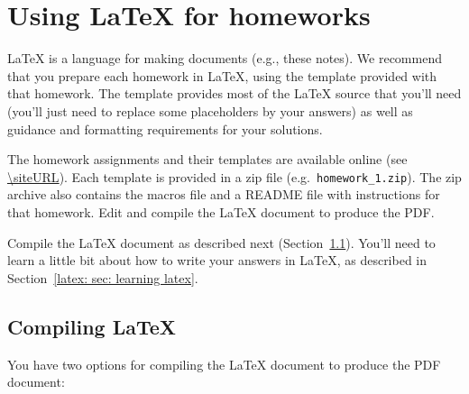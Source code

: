 
\section{Using LaTeX for homeworks}\label{latex: sec: latex}\hypertarget{latex.homeworks}{}

LaTeX is a language for making documents (e.g., these notes).
We recommend that you prepare each homework in LaTeX, using the template provided with that homework.
The template provides most of the LaTeX source that you'll need
(you'll just need to replace some placeholders by your answers)
as well as guidance and formatting requirements for your solutions.

The homework assignments and their templates are available online
(see \url{\siteURL}).
Each template is provided in a zip file (e.g.~\texttt{homework\_1.zip}).
The zip archive also contains the macros file
and a README file with instructions for that homework.
Edit and compile the LaTeX document to produce the PDF.

Compile the LaTeX document as described next (Section~\ref{latex: sec: compiling latex}).
You'll need to learn a little bit about how to write your answers in LaTeX,
as described in Section~\ref{latex: sec: learning latex}.

\subsection{Compiling LaTeX}\label{latex: sec: compiling latex}
You have two options for compiling the LaTeX document to produce the PDF document:

